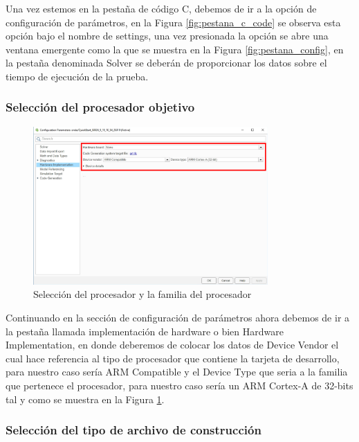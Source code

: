 Una vez estemos en la pestaña de código C, debemos de ir a la opción de configuración de parámetros, en la Figura \ref{fig:pestana_c_code} se observa esta opción bajo el nombre de settings, una vez presionada la opción se abre una ventana emergente como la que se muestra en la Figura \ref{fig:pestana_config}, en la pestaña denominada Solver se deberán de proporcionar los datos sobre el tiempo de ejecución de la prueba.

\subsubsection{Selección del procesador objetivo}

\begin{figure}[h!]
    \centering
    \includegraphics[width=0.8\textwidth]{fig/especifico_2/M2MT/paso_a_paso_mtmt/configuration_parameters_processor.pdf}
    \caption{Selección del procesador y la familia del procesador}
    \label{fig:pestana_config_procesador}
\end{figure}

Continuando en la sección de configuración de parámetros ahora debemos de ir a la pestaña llamada implementación de hardware o bien Hardware Implementation, en donde deberemos de colocar los datos de Device Vendor el cual hace referencia al tipo de procesador que contiene la tarjeta de desarrollo, para nuestro caso sería ARM Compatible y el Device Type que seria a la familia que pertenece el procesador, para nuestro caso sería un ARM Cortex-A de 32-bits tal y como se muestra en la Figura \ref{fig:pestana_config_procesador}.


\subsubsection{Selección del tipo de archivo de construcción}

